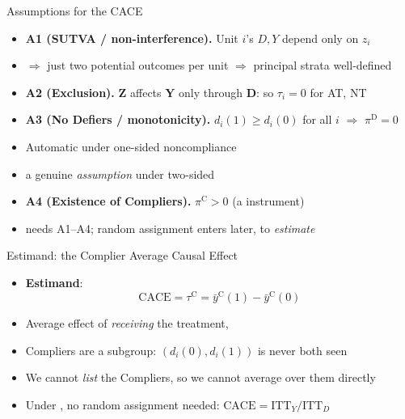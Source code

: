 \documentclass[table, xcolor = {dvipsnames}, 9pt]{beamer}
\theoremstyle{plain}
\newcommand{\mh}[1]{{\color{magenta}{#1}}}
\newcommand{\ITTY}{\mathrm{ITT}_Y}
\newcommand{\ITTD}{\mathrm{ITT}_D}
\newcommand{\CACE}{\mathrm{CACE}}
\begin{document}
\begin{frame}[t]{Assumptions for the CACE}
\vfill
\begin{itemize} \vfill
\item \textbf{A1 (SUTVA / non-interference).} Unit $i$'s $D, Y$ depend only on $z_i$ \vfill
\item[] $\Rightarrow$ just two potential outcomes per unit $\Rightarrow$ principal strata well-defined \vfill
\item \textbf{A2 (Exclusion).} $\bm{Z}$ affects $\bm{Y}$ only through $\bm{D}$: so $\tau_i = 0$ for AT, NT \vfill
\item \textbf{A3 (No Defiers / monotonicity).} $d_i(1) \geq d_i(0)$ for all $i$ $\Rightarrow$ $\pi^{\textrm{D}} = 0$ \vfill
\item[] Automatic under one-sided noncompliance \vfill
\item[] a genuine \emph{assumption} under two-sided \vfill
\item \textbf{A4 (Existence of Compliers).} $\pi^{\textrm{C}} > 0$ (a \mh{strong} instrument) \vfill
\item \mh{Identification} needs A1--A4; random assignment enters later, to \emph{estimate} \vfill
\end{itemize} \vfill
\end{frame}
\begin{frame}[t]{Estimand: the Complier Average Causal Effect}
\vfill
\begin{itemize} \vfill
\item \textbf{Estimand}:
\begin{equation*}
\CACE = \tau^{\textrm{C}} = \bar{y}^{\textrm{C}}(1) - \bar{y}^{\textrm{C}}(0)
\end{equation*} \vfill
\item Average effect of \emph{receiving} the treatment, \mh{among Compliers} \vfill
\item Compliers are a \mh{latent} subgroup: $\left(d_i(0), d_i(1)\right)$ is never both seen \vfill
\item[] We cannot \emph{list} the Compliers, so we cannot average over them directly \vfill
\item Under \mh{A1--A4}, no random assignment needed: $\CACE = \ITTY / \ITTD$ \vfill
\end{itemize} \vfill
\end{frame}
\end{document}
